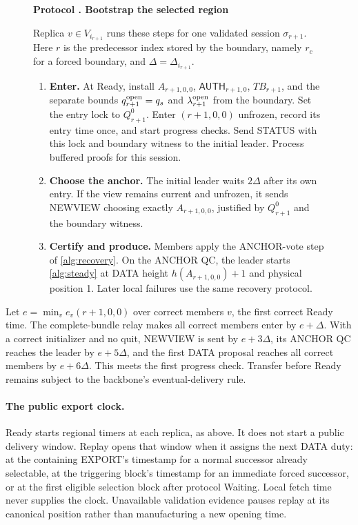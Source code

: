 \documentclass[11pt,a4paper]{article}
\newcommand{\TB}{\mathit{TB}}
\newcommand{\tagg}[1]{\ensuremath{\mathsf{#1}}}
\newcounter{protocol}
\newenvironment{protocol}[2]{\begin{figure}[htbp]\refstepcounter{protocol}\label{#1}
\begin{mdframed}[linewidth=.6pt,skipabove=0pt,skipbelow=0pt,
innertopmargin=7pt,innerbottommargin=7pt]\small
\textbf{Protocol \theprotocol. #2}\par\smallskip}{\end{mdframed}\end{figure}}
\begin{document}
\begin{protocol}{alg:bootstrap}{Bootstrap the selected region}
Replica $v\in V_{i_{r+1}}$ runs these steps for one validated
session $\sigma_{r+1}$. Here $r$ is the predecessor index stored by
the boundary, namely $r_c$ for a forced boundary, and
$\Delta=\Delta_{i_{r+1}}$.
\begin{enumerate}[label=\textbf{\arabic*)},itemsep=3pt]
\item \textbf{Enter.} At Ready, install $A_{r+1,0,0}$,
$\tagg{AUTH}_{r+1,0}$, $\TB_{r+1}$, and the separate bounds $q^{\rm open}_{r+1}=q_s$ and
$\lambda^{\rm open}_{r+1}$ from the boundary. Set the entry lock
to $Q^0_{r+1}$. Enter $(r+1,0,0)$ unfrozen, record its entry time once,
and start progress checks. Send STATUS with this lock and boundary
witness to the initial leader. Process buffered proofs for this session.
\item \textbf{Choose the anchor.} The initial leader waits $2\Delta$
after its own entry. If the view remains current and unfrozen, it sends
NEWVIEW choosing exactly $A_{r+1,0,0}$, justified by $Q^0_{r+1}$ and
the boundary witness.
\item \textbf{Certify and produce.} Members apply the ANCHOR-vote step
of \cref{alg:recovery}. On the ANCHOR QC, the leader starts
\cref{alg:steady} at DATA height $h(A_{r+1,0,0})+1$ and physical
position 1. Later local failures use the same recovery protocol.
\end{enumerate}
\end{protocol}

Let $e=\min_v e_v(r+1,0,0)$ over correct members $v$, the
first correct Ready time. The complete-bundle relay makes
all correct members enter by $e+\Delta$. With a correct initializer and
no quit, NEWVIEW is sent by $e+3\Delta$, its ANCHOR QC reaches the
leader by $e+5\Delta$, and the first DATA proposal reaches all correct
members by $e+6\Delta$. This meets the first progress check. Transfer
before Ready remains subject to the backbone's eventual-delivery rule.



\paragraph{The public export clock.}
Ready starts regional timers at each replica, as above. It does not
start a public delivery window. Replay opens that window when it
assigns the next DATA duty: at the containing EXPORT's timestamp for
a normal successor already selectable, at the triggering block's
timestamp for an immediate forced successor, or at the first eligible
selection block after protocol Waiting. Local fetch time never supplies
the clock. Unavailable validation evidence pauses replay at its
canonical position rather than manufacturing a new opening time.
\end{document}
